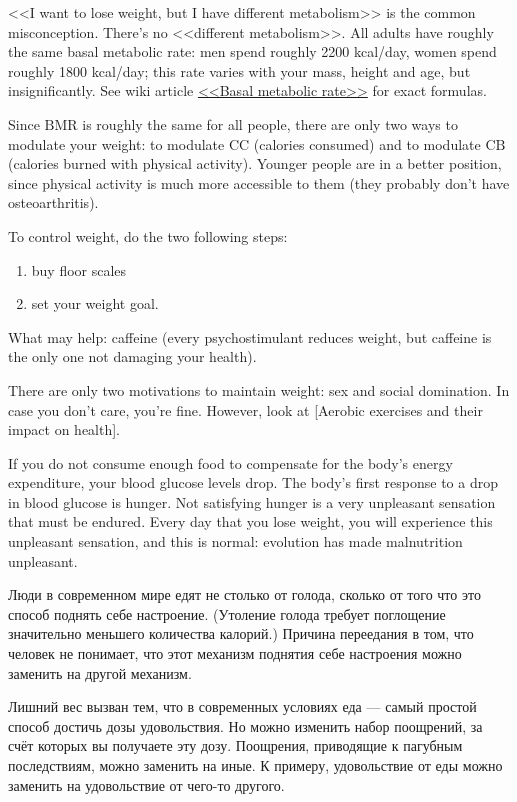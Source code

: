 \documentclass[11pt]{article}
\theoremstyle{remark}
\theoremstyle{definition}
\begin{document}
\begin{enumerate}
<<I want to lose weight, but I have different metabolism>> is the common misconception. There's no <<different metabolism>>. All adults have roughly the same basal metabolic rate: men spend roughly 2200 kcal/day, women spend roughly 1800 kcal/day; this rate varies with your mass, height and age, but insignificantly. See wiki article \href{https://en.wikipedia.org/wiki/Basal_metabolic_rate}{<<Basal metabolic rate>>} for exact formulas.

Since $\text{BMR}$ is roughly the same for all people, there are only two ways to modulate your weight: to modulate $\text{CC}$ (calories consumed) and to modulate $\text{CB}$ (calories burned with physical activity). Younger people are in a better position, since physical activity is much more accessible to them (they probably don't have osteoarthritis).

To control weight, do the two following steps:
\begin{enumerate}
\item buy floor scales
\item set your weight goal.
\end{enumerate}

What may help: caffeine (every psychostimulant reduces weight, but caffeine is the only one not damaging your health).

There are only two motivations to maintain weight: sex and social domination. In case you don't care, you're fine. However, look at [Aerobic exercises and their impact on health].


If you do not consume enough food to compensate for the body's energy expenditure, your blood glucose levels drop. The body's first response to a drop in blood glucose is hunger. Not satisfying hunger is a very unpleasant sensation that must be endured. Every day that you lose weight, you will experience this unpleasant sensation, and this is normal: evolution has made malnutrition unpleasant.


Люди в современном мире едят не столько от голода, сколько от того что это способ поднять себе настроение. (Утоление голода требует поглощение значительно меньшего количества калорий.) Причина переедания в том, что человек не понимает, что этот механизм поднятия себе настроения можно заменить на другой механизм.

Лишний вес вызван тем, что в современных условиях еда --- самый простой способ достичь дозы удовольствия. Но можно изменить набор поощрений, за счёт которых вы получаете эту дозу. Поощрения, приводящие к пагубным последствиям, можно заменить на иные. К примеру, удовольствие от еды можно заменить на удовольствие от чего-то другого. 


\end{enumerate}
\end{document}

